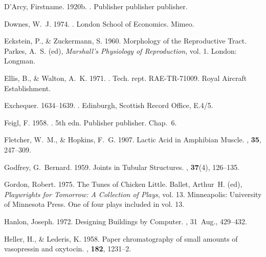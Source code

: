 \begin{thebibliography}{}
D'Arcy, Firstname. 1920b.
.
\newblock Publisher publisher publisher.

Downes, W.~J. 1974.
.
\newblock London School of Economics. Mimeo.

Eckstein, P., \& Zuckermann, S. 1960.
\newblock Morphology of the Reproductive Tract.
 Parkes, A.~S. (ed), {\em Marshall's
  Physiology of Reproduction},  vol. 1.
\newblock London: Longman.

Ellis, B., \& Walton, A.~K. 1971.
.
\newblock Tech. rept. RAE-TR-71009. Royal Aircraft Establishment.

Exchequer. 1634--1639.
.
\newblock Edinburgh, Scottish Record Office, E.4/5.

Feigl, F. 1958.
. 5th edn.
\newblock Publisher publisher.
\newblock Chap.~6.

Fletcher, W.~M., \& Hopkins, F.~G. 1907.
\newblock Lactic Acid in Amphibian Muscle.
, {\bf 35}, 247--309.

Godfrey, G.~Bernard. 1959.
\newblock Joints in Tubular Structures.
, {\bf 37}(4), 126--135.

Gordon, Robert. 1975.
\newblock The Tunes of {Chicken Little}.
 Ballet, Arthur~H. (ed), {\em Playwrights for Tomorrow: A
  Collection of Plays},  vol. 13.
\newblock Minneapolis: University of Minnesota Press.
\newblock One of four plays included in vol. 13.

Hanlon, Joseph. 1972.
\newblock Designing Buildings by Computer.
, 31~Aug., 429--432.

Heller, H., \& Lederis, K. 1958.
\newblock Paper chromatography of small amounts of vasopressin and oxytocin.
, {\bf 182}, 1231--2.


\end{thebibliography}
